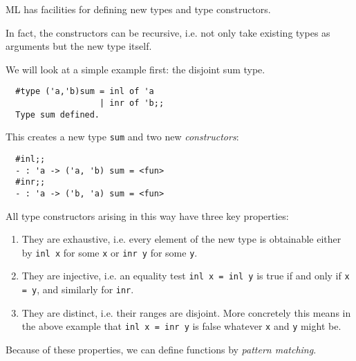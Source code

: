 \begin{slide*}


\vspace*{0.5cm}

ML has facilities for defining new types and type constructors.

In fact, the constructors can be recursive, i.e. not only take existing types
as arguments but the new type itself.

We will look at a simple example first: the disjoint sum type.

\begin{black}\begin{verbatim}
  #type ('a,'b)sum = inl of 'a
                   | inr of 'b;;
  Type sum defined.
\end{verbatim}\end{black}

This creates a new type {\black \tt sum} and two new {\em constructors}:

\begin{black}\begin{verbatim}
  #inl;;
  - : 'a -> ('a, 'b) sum = <fun>
  #inr;;
  - : 'a -> ('b, 'a) sum = <fun>
\end{verbatim}\end{black}

\end{slide*}


\begin{slide*}


\vspace*{0.5cm}

All type constructors arising in this way have three key properties:

\begin{enumerate}

\item They are exhaustive, i.e. every element of the new type is obtainable
either by  {\black \tt inl x} for some {\black \tt x} or {\black \tt inr y} for some {\black \tt y}.

\item They are injective, i.e. an equality test {\black \tt inl x = inl y} is true if
and only if {\black \tt x = y}, and similarly for {\black \tt inr}.

\item They are distinct, i.e. their ranges are disjoint. More concretely this
means in the above example that {\black \tt inl x = inr y} is false whatever {\black \tt x}
and {\black \tt y} might be.

\end{enumerate}

Because of these properties, we can define functions by {\em pattern matching}.

\end{slide*}




